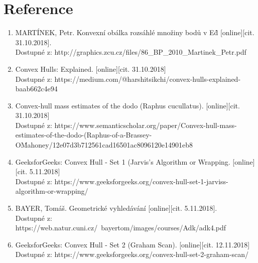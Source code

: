 \documentclass[a4paper, 12pt]{article}
\begin{document}
\clearpage
\section{Reference}

\begin{enumerate}
\item  MARTÍNEK, Petr. Konvexní obálka rozsáhlé množiny bodů v E\^d [online][cit. 31.10.2018]. \\
Dostupné z: http://graphics.zcu.cz/files/86\_BP\_2010\_Martinek\_Petr.pdf  \\

\item Convex Hulls: Explained. [online][cit. 31.10.2018]\\
Dostupné z: https://medium.com/@harshitsikchi/convex-hulls-explained-baab662c4e94\\

\item Convex-hull mass estimates of the dodo (Raphus cucullatus). [online][cit. 31.10.2018]\\
Dostupné z: https://www.semanticscholar.org/paper/Convex-hull-mass-estimates-of-the-dodo-(Raphus-of-a-Brassey-O\'Mahoney/12e07d3b712561cad16501ac8096120e14901eb8

\item GeeksforGeeks: Convex Hull - Set 1 (Jarvis's Algorithm or Wrapping. [online][cit. 5.11.2018]\\
Dostupné z: https://www.geeksforgeeks.org/convex-hull-set-1-jarviss-algorithm-or-wrapping/

\item  BAYER, Tomáš. Geometrické vyhledávání [online][cit. 5.11.2018]. \\
Dostupné z: https://web.natur.cuni.cz/~bayertom/images/courses/Adk/adk4.pdf  \\

\item GeeksforGeeks: Convex Hull - Set 2 (Graham Scan). [online][cit. 12.11.2018]\\
Dostupné z: https://www.geeksforgeeks.org/convex-hull-set-2-graham-scan/



\end{enumerate}
\end{document}
